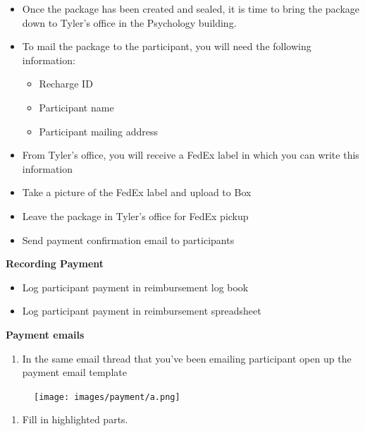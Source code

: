 \documentclass[
]{book}
\providecommand{\tightlist}{%
  \setlength{\itemsep}{0pt}\setlength{\parskip}{0pt}}
\begin{document}
\begin{itemize}
\tightlist
\item
  Once the package has been created and sealed, it is time to bring the package down to Tyler's office in the Psychology building.
\item
  To mail the package to the participant, you will need the following information:

  \begin{itemize}
  \tightlist
  \item
    Recharge ID
  \item
    Participant name
  \item
    Participant mailing address
  \end{itemize}
\item
  From Tyler's office, you will receive a FedEx label in which you can write this information
\item
  Take a picture of the FedEx label and upload to Box
\item
  Leave the package in Tyler's office for FedEx pickup
\item
  Send payment confirmation email to participants
\end{itemize}

\textbf{Recording Payment}

\begin{itemize}
\tightlist
\item
  Log participant payment in reimbursement log book
\item
  Log participant payment in reimbursement spreadsheet
\end{itemize}

\textbf{Payment emails}

\begin{enumerate}
\def\labelenumi{\arabic{enumi}.}
\tightlist
\item
  In the same email thread that you've been emailing participant open up the payment email template
\end{enumerate}

\begin{figure}
\centering
\texttt{[image: images/payment/a.png]}
\caption{}
\end{figure}

\begin{enumerate}
\def\labelenumi{\arabic{enumi}.}
\setcounter{enumi}{1}
\tightlist
\item
  Fill in highlighted parts.
\end{enumerate}
\end{document}
